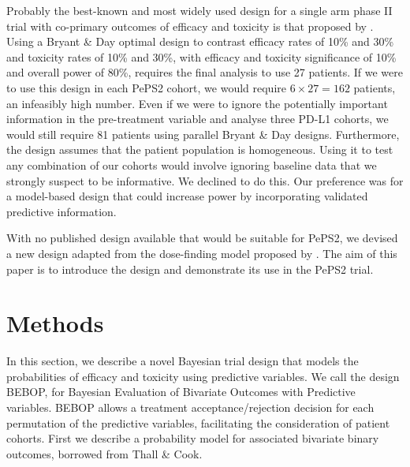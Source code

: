 \documentclass[alpha-refs]{wiley-article}
\begin{document}
Probably the best-known and most widely used design for a single arm phase II trial with co-primary outcomes of efficacy and toxicity is that proposed by \cite{Bryant1995}. 
Using a Bryant \& Day optimal design to contrast efficacy rates of 10\% and 30\% and toxicity rates of 10\% and 30\%, with efficacy and toxicity significance of 10\% and overall power of 80\%, requires the final analysis to use 27 patients.
If we were to use this design in each PePS2 cohort, we would require $6 \times 27 = 162$ patients, an infeasibly high number.
Even if we were to ignore the potentially important information in the pre-treatment variable and analyse three PD-L1 cohorts, we would still require 81 patients using parallel Bryant \& Day designs.
Furthermore, the design assumes that the patient population is homogeneous.
Using it to test any combination of our cohorts would involve ignoring baseline data that we strongly suspect to be informative. 
We declined to do this.
Our preference was for a model-based design that could increase power by incorporating validated predictive information.

With no published design available that would be suitable for PePS2, we devised a new design adapted from the dose-finding model proposed by \cite{Thall2004}. 
The aim of this paper is to introduce the design and demonstrate its use in the PePS2 trial. 




\section{Methods}
\label{s:alternative}
In this section, we describe a novel Bayesian trial design that models the probabilities of efficacy and toxicity using  predictive variables. 
We call the design BEBOP, for Bayesian Evaluation of Bivariate Outcomes with Predictive variables.
BEBOP allows a treatment acceptance/rejection decision for each permutation of the predictive variables, facilitating the consideration of patient cohorts.
First we describe a probability model for associated bivariate binary outcomes, borrowed from Thall \& Cook\cite{Thall2004}.
\end{document}
